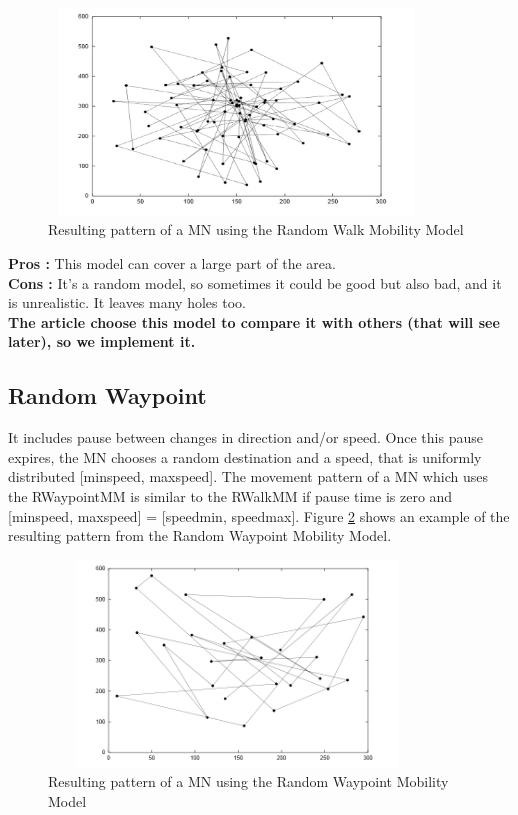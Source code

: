 \begin{figure}[h]
\center
\includegraphics[width=10cm,height=55mm]{../images/randomwalk1.png}
\caption{\label{RandomWalkFig}Resulting pattern of a MN using the Random Walk Mobility Model\cite{SurveyMobilityModelsAdHoc1}}
\end{figure}

\noindent\textbf{Pros :} This model can cover a large part of the area.\\
\textbf{Cons :} It's a random model, so sometimes it could be good but also bad, and it is unrealistic. It leaves many holes too.\\
\textbf{The article choose this model to compare it with others (that will see later), so we implement it.}\\

\subsection{Random Waypoint}

It includes pause between changes in direction and/or speed. Once this pause expires, the MN chooses a random destination and a speed, that is uniformly distributed [minspeed, maxspeed]. The movement pattern of a MN which uses the RWaypointMM is similar to the RWalkMM if pause time is zero and [minspeed, maxspeed] = [speedmin, speedmax]. Figure \ref{RandomWaypointFig} shows an example of the resulting pattern from the Random Waypoint Mobility Model.\\

\begin{figure}[h]
\center
\includegraphics[width=10cm,height=55mm]{../images/randomwaypoint1.png}
\caption{\label{RandomWaypointFig}Resulting pattern of a MN using the Random Waypoint Mobility Model\cite{SurveyMobilityModelsAdHoc1}}
\end{figure}

